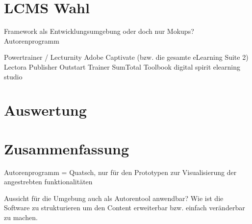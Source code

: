 \documentclass[a4paper, 12pt, twoside, BCOR=20mm, DIV=calc, abstracton, parskip=half*, toc=bibliography, toc=listof, headsepline, footsepline, headings=small, numbers=enddot]{scrreprt}
\begin{document}
	
	
	\section{\ac{LCMS} Wahl}
	Framework als Entwicklungsumgebung oder doch nur Mokups? 
	Autorenprogramm
	
	Powertrainer / Lecturnity 
	Adobe Captivate (bzw. die gesamte eLearning Suite 2) 
	Lectora Publisher 
	Outstart Trainer 
	SumTotal Toolbook 
	digital spirit elearning studio  
	
	
	
	\section{Auswertung}
	\section{Zusammenfassung} 
	Autorenprogramm = Quatsch, nur für den Prototypen zur Visualisierung der angestrebten funktionalitäten
	
	Aussicht für die Umgebung auch als Autorentool anwendbar? Wie ist die Software zu strukturieren um den Content erweiterbar bzw. einfach veränderbar zu machen. 
	
\end{document}
